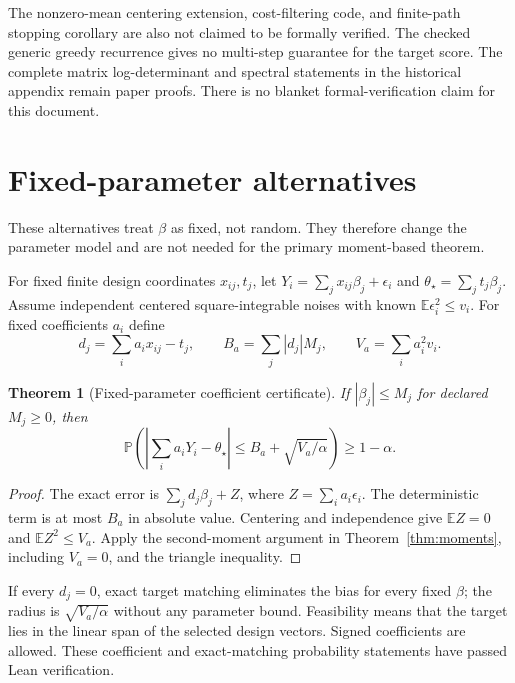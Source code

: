\documentclass[11pt]{article}
\newtheorem{theorem}{Theorem}
\theoremstyle{remark}
\newcommand{\E}{\mathbb E}
\newcommand{\Prob}{\mathbb P}
\begin{document}
The nonzero-mean centering extension, cost-filtering code, and finite-path stopping corollary are also not claimed to be formally verified. The checked generic greedy recurrence gives no multi-step guarantee for the target score. The complete matrix log-determinant and spectral statements in the historical appendix remain paper proofs. There is no blanket formal-verification claim for this document.

\appendix
\section{Fixed-parameter alternatives}
\label{sec:fixed}
These alternatives treat $\beta$ as fixed, not random. They therefore change the parameter model and are not needed for the primary moment-based theorem.

For fixed finite design coordinates $x_{ij},t_j$, let
$Y_i=\sum_jx_{ij}\beta_j+\epsilon_i$ and
$\theta_\star=\sum_jt_j\beta_j$. Assume independent centered square-integrable noises with known $\E\epsilon_i^2\le v_i$. For fixed coefficients $a_i$ define
\[
 d_j=\sum_i a_ix_{ij}-t_j,\qquad
 B_a=\sum_j|d_j|M_j,\qquad V_a=\sum_i a_i^2v_i.
\]
\begin{theorem}[Fixed-parameter coefficient certificate]\label{thm:coefficient}
If $|\beta_j|\le M_j$ for declared $M_j\ge0$, then
\[
 \Prob\left(\left|\sum_i a_iY_i-\theta_\star\right|
              \le B_a+\sqrt{V_a/\alpha}\right)\ge1-\alpha.
\]
\end{theorem}
\begin{proof}
The exact error is $\sum_jd_j\beta_j+Z$, where $Z=\sum_i a_i\epsilon_i$.
The deterministic term is at most $B_a$ in absolute value. Centering and independence give $\E Z=0$ and $\E Z^2\le V_a$. Apply the second-moment argument in Theorem~\ref{thm:moments}, including $V_a=0$, and the triangle inequality.
\end{proof}
If every $d_j=0$, exact target matching eliminates the bias for every fixed $\beta$; the radius is $\sqrt{V_a/\alpha}$ without any parameter bound. Feasibility means that the target lies in the linear span of the selected design vectors. Signed coefficients are allowed. These coefficient and exact-matching probability statements have passed Lean verification.
\end{document}

